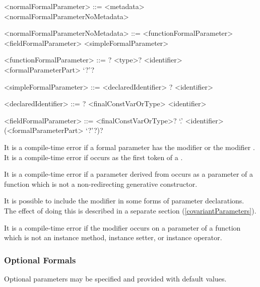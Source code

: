 \documentclass[makeidx]{article}
\begin{document}
\begin{grammar}
<normalFormalParameter> ::= \gnewline{}
  <metadata> <normalFormalParameterNoMetadata>

<normalFormalParameterNoMetadata> ::= <functionFormalParameter>
  \alt <fieldFormalParameter>
  \alt <simpleFormalParameter>

<functionFormalParameter> ::= \gnewline{}
  \COVARIANT? <type>? <identifier> <formalParameterPart> `?'?

<simpleFormalParameter> ::= <declaredIdentifier>
  \alt \COVARIANT? <identifier>

<declaredIdentifier> ::= \COVARIANT? <finalConstVarOrType> <identifier>

<fieldFormalParameter> ::= \gnewline{}
  <finalConstVarOrType>? \THIS{} `.' <identifier> (<formalParameterPart> `?'?)?
\end{grammar}

\LMHash{}%
It is a compile-time error if a formal parameter has the modifier \CONST{}
or the modifier \LATE.
It is a compile-time error if \VAR{} occurs as
the first token of a .

\LMHash{}%
It is a compile-time error if a parameter derived from
 occurs as a parameter of a function
which is not a non-redirecting generative constructor.


\LMHash{}%
It is possible to include the modifier \COVARIANT{}
in some forms of parameter declarations.
The effect of doing this is described in a separate section
(\ref{covariantParameters}).


\LMHash{}%
It is a compile-time error if the modifier \COVARIANT{} occurs on
a parameter of a function which is not
an instance method, instance setter, or instance operator.


\subsubsection{Optional Formals}

\LMHash{}%
Optional parameters may be specified and provided with default values.
\end{document}
